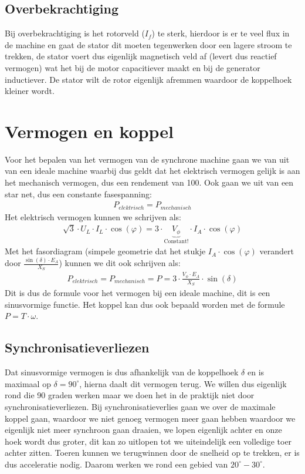 \subsection{Overbekrachtiging}
Bij overbekrachtiging is het rotorveld ($I_f$) te sterk, hierdoor is er te veel flux in de
machine en gaat de stator dit moeten tegenwerken door een lagere stroom te trekken, de
stator voert dus eigenlijk magnetisch veld af (levert dus reactief vermogen) wat het bij de
motor capacitiever maakt en bij de generator inductiever.
De stator wilt de rotor eigenlijk afremmen waardoor de koppelhoek kleiner wordt.

\section{Vermogen en koppel}
Voor het bepalen van het vermogen van de synchrone machine gaan we van uit van een ideale
machine waarbij dus geldt dat het elektrisch vermogen gelijk is aan het mechanisch
vermogen, dus een rendement van 100.
Ook gaan we uit van een star net, dus een constante fasespanning:
\begin{align*}
    P_{elektrisch} = P_{mechanisch}
\end{align*}
Het elektrisch vermogen kunnen we schrijven als:
\begin{align*}
    \sqrt{3} \cdot U_L \cdot I_L \cdot \cos(\varphi) = 3 \cdot \underbrace{V_{\phi}}_{\text{Constant!}} \cdot I_A \cdot \cos(\varphi)
\end{align*}
Met het fasordiagram (simpele geometrie dat het stukje $I_A \cdot \cos(\varphi)$ verandert
door $\frac{\sin(\delta) \cdot E_A}{X_S}$) kunnen we dit ook schrijven als:
\begin{align*}
    P_{elektrisch} = P_{mechanisch} = P = 3 \cdot \frac{V_{\phi} \cdot E_A}{X_S} \cdot \sin(\delta)
\end{align*}
Dit is dus de formule voor het vermogen bij een ideale machine, dit is een sinusvormige
functie.
Het koppel kan dus ook bepaald worden met de formule $P = T \cdot \omega$.

\subsection{Synchronisatieverliezen}
Dat sinusvormige vermogen is dus afhankelijk van de koppelhoek $\delta$ en is maximaal op
$\delta = 90^\circ$, hierna daalt dit vermogen terug.
We willen dus eigenlijk rond die 90 graden werken maar we doen het in de praktijk niet door
synchronisatieverliezen.
Bij synchronisatieverlies gaan we over de maximale koppel gaan, waardoor we niet genoeg
vermogen meer gaan hebben waardoor we eigenlijk niet meer synchroon gaan draaien, we lopen
eigenlijk achter en onze hoek wordt dus groter, dit kan zo uitlopen tot we uiteindelijk een
volledige toer achter zitten.
Toeren kunnen we terugwinnen door de snelheid op te trekken, er is dus acceleratie nodig.
Daarom werken we rond een gebied van $20^\circ-30^\circ$.

